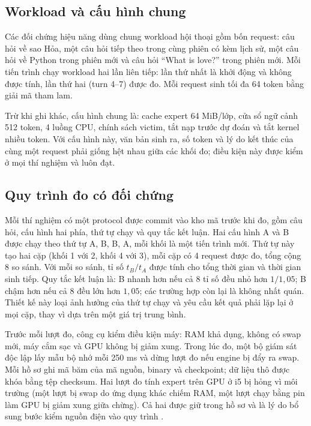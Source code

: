 \subsection{Workload và cấu hình chung}

Các đối chứng hiệu năng dùng chung workload hội thoại gồm bốn request: câu hỏi về sao Hỏa, một câu hỏi tiếp theo trong cùng phiên có kèm lịch sử, một câu hỏi về Python trong phiên mới và câu hỏi ``What is love?'' trong phiên mới. Mỗi tiến trình chạy workload hai lần liên tiếp: lần thứ nhất là khởi động và không được tính, lần thứ hai (turn 4--7) được đo. Mỗi request sinh tối đa 64 token bằng giải mã tham lam.

Trừ khi ghi khác, cấu hình chung là: cache expert 64 MiB/lớp, cửa sổ ngữ cảnh 512 token, 4 luồng CPU, chính sách victim, tắt nạp trước dự đoán và tắt kernel nhiều token. Với cấu hình này, văn bản sinh ra, số token và lý do kết thúc của cùng một request phải giống hệt nhau giữa các khối đo; điều kiện này được kiểm ở mọi thí nghiệm và luôn đạt.

\subsection{Quy trình đo có đối chứng}

Mỗi thí nghiệm có một protocol được commit vào kho mã trước khi đo, gồm câu hỏi, cấu hình hai phía, thứ tự chạy và quy tắc kết luận. Hai cấu hình A và B được chạy theo thứ tự A, B, B, A, mỗi khối là một tiến trình mới. Thứ tự này tạo hai cặp (khối 1 với 2, khối 4 với 3), mỗi cặp có 4 request được đo, tổng cộng 8 so sánh. Với mỗi so sánh, tỉ số $t_B/t_A$ được tính cho tổng thời gian và thời gian sinh tiếp. Quy tắc kết luận là: B nhanh hơn nếu cả 8 tỉ số đều nhỏ hơn $1/1{,}05$; B chậm hơn nếu cả 8 đều lớn hơn $1{,}05$; các trường hợp còn lại là không nhất quán. Thiết kế này loại ảnh hưởng của thứ tự chạy và yêu cầu kết quả phải lặp lại ở mọi cặp, thay vì dựa trên một giá trị trung bình.

Trước mỗi lượt đo, công cụ kiểm điều kiện máy: RAM khả dụng, không có swap mới, máy cắm sạc và GPU không bị giảm xung. Trong lúc đo, một bộ giám sát độc lập lấy mẫu bộ nhớ mỗi 250 ms và dừng lượt đo nếu engine bị đẩy ra swap. Mỗi hồ sơ ghi mã băm của mã nguồn, binary và checkpoint; dữ liệu thô được khóa bằng tệp checksum. Hai lượt đo tính expert trên GPU ở i5 bị hỏng vì môi trường (một lượt bị swap do ứng dụng khác chiếm RAM, một lượt chạy bằng pin làm GPU bị giảm xung giữa chừng). Cả hai được giữ trong hồ sơ và là lý do bổ sung bước kiểm nguồn điện vào quy trình \cite{exp_gpu_compute}.

